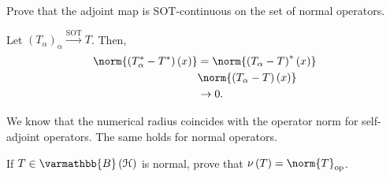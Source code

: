 \documentclass[10pt]{mypackage}
\renewcommand*{\mathbb}[1]{\varmathbb{#1}}
\newcommand{\B}{\mathbb{B}}
\begin{document}
\begin{exercise}
  Prove that the adjoint map is SOT-continuous on the set of normal operators.
\end{exercise}
\begin{solution}
  Let $\left(T_{\alpha}\right)_{\alpha} \xrightarrow{\text{SOT}} T$. Then,
  \begin{align*}
    \norm{\left(T_{\alpha}^{\ast}- T^{\ast}\right)\left(x\right)} &= \norm{\left(T_{\alpha} - T\right)^{\ast}\left(x\right)}\\ 
                                                               &\norm{\left(T_{\alpha} - T\right)\left(x\right)}\\
                                                               &\rightarrow 0.
  \end{align*}
\end{solution}
We know that the numerical radius coincides with the operator norm for self-adjoint operators. The same holds for normal operators.
\begin{exercise}
  If $T\in \B\left(\mathcal{H}\right)$ is normal, prove that $\nu\left(T\right) = \norm{T}_{\text{op}}$.
\end{exercise}
\end{document}
